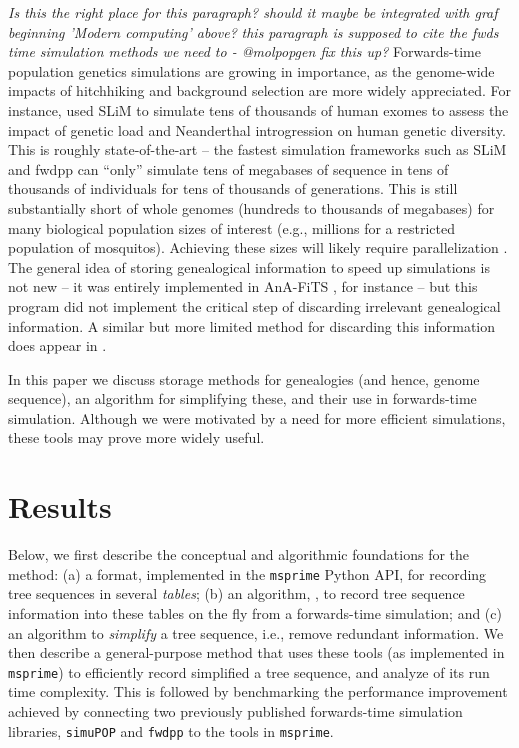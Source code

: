 \documentclass{article}
\newcommand{\simupop}{\texttt{simuPOP}}
\newcommand{\fwdpp}{\texttt{fwdpp}}
\newcommand{\msprime}{\texttt{msprime}}
\newcommand{\plr}[1]{{\em \color{blue} #1}}
\newcommand{\jda}[1]{{\em \color{cyan} #1}}
\begin{document}
\jda{Is this the right place for this paragraph? should it maybe be integrated
	with graf beginning 'Modern computing' above?}
\plr{this paragraph is supposed to cite the fwds time simulation methods we need to - @molpopgen fix this up?}
Forwards-time population genetics simulations are growing in importance,
as the genome-wide impacts of hitchhiking and background selection are more widely appreciated.
For instance, \citet{harris2016genetic} used SLiM \citep{haller2017flexible} to simulate tens of thousands of human exomes
to assess the impact of genetic load and Neanderthal introgression on human genetic diversity.
This is roughly state-of-the-art 
-- the fastest simulation frameworks such as SLiM and fwdpp \citep{fwdpp}
can ``only'' simulate tens of megabases of sequence in tens of thousands of individuals
for tens of thousands of generations.
This is still substantially short of whole genomes (hundreds to thousands of megabases)
for many biological population sizes of interest 
(e.g., millions for a restricted population of mosquitos).
Achieving these sizes will likely require parallelization \citep{lawrie2017accelerating}.
The general idea of storing genealogical information to speed up simulations is not new --
it was entirely implemented in AnA-FiTS \citep{aberer2013rapid}, for instance --
but this program did not implement the critical step of discarding irrelevant genealogical information.
A similar but more limited method for discarding this information does appear in \citet{padhukasahasram2008exploring}.

In this paper we discuss storage methods for genealogies (and hence, genome sequence),
an algorithm for simplifying these,
and their use in forwards-time simulation.
Although we were motivated by a need for more efficient simulations,
these tools may prove more widely useful.


\section*{Results}


Below, we first describe the conceptual and algorithmic foundations for the method:
(a) a format, implemented in the \msprime{} Python API,
for recording tree sequences in several \emph{tables};
(b) an algorithm, , to record tree sequence information into these tables on the fly
    from a forwards-time simulation;
and (c) an algorithm to \emph{simplify} a tree sequence, i.e., remove redundant information.
We then describe a general-purpose method that uses these tools
(as implemented in \msprime{}) 
to efficiently record simplified a tree sequence,
and analyze of its run time complexity.
This is followed by benchmarking the performance improvement achieved by connecting
two previously published forwards-time simulation libraries,
\simupop{} \citep{simupop} and \fwdpp{} \citep{fwdpp}
to the tools in \msprime{}.
\end{document}

